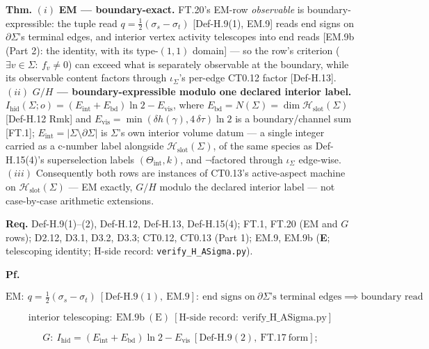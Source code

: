 \begin{theorem}\label{tag:FT-21}
\textbf{Thm.} $(i)$ \textbf{EM — boundary-exact.} FT.20's EM-row \textit{observable} is boundary-expressible: the tuple read $q=\tfrac12(\sigma_s-\sigma_t)$ [Def-H.9(1), EM.9] reads end signs on $\partial\Sigma$'s terminal edges, and interior vertex activity telescopes into end reads [EM.9b (Part 2): the identity, with its type-$(1,1)$ domain] — so the row's criterion ($\exists v\in\Sigma:\ f_v\ne0$) can exceed what is separately observable at the boundary, while its observable content factors through $\iota_\Sigma$'s per-edge CT0.12 factor [Def-H.13]. $(ii)$ \textbf{$G/H$ — boundary-expressible modulo one declared interior label.} $I_{\mathrm{hid}}(\Sigma;o)=(E_{\mathrm{int}}+E_{\mathrm{bd}})\ln2-E_{\mathrm{vis}}$, where $E_{\mathrm{bd}}=N(\Sigma)=\dim\mathcal H_{\mathrm{slot}}(\Sigma)$ [Def-H.12 Rmk] and $E_{\mathrm{vis}}=\min(\delta h(\gamma),4\,\delta\tau)\ln2$ is a boundary/channel sum [FT.1]; $E_{\mathrm{int}}=|\Sigma\setminus\partial\Sigma|$ is $\Sigma$'s own interior volume datum — a single integer carried as a c-number label alongside $\mathcal H_{\mathrm{slot}}(\Sigma)$, of the same species as Def-H.15(4)'s superselection labels $(\Theta_{\mathrm{int}},k)$, and $\neg$factored through $\iota_\Sigma$ edge-wise. $(iii)$ Consequently both rows are instances of CT0.13's active-aspect machine on $\mathcal H_{\mathrm{slot}}(\Sigma)$ — EM exactly, $G/H$ modulo the declared interior label — not case-by-case arithmetic extensions.

\textbf{Req.} Def-H.9(1)–(2), Def-H.12, Def-H.13, Def-H.15(4); FT.1, FT.20 (EM and $G$ rows); D2.12, D3.1, D3.2, D3.3; CT0.12, CT0.13 (Part 1); EM.9, EM.9b (\textbf{E}; telescoping identity; H-side record: \texttt{verify\_\allowbreak{}H\_\allowbreak{}ASigma.py}).

\textbf{Pf.}

\[
\mathrm{EM}:\ q=\tfrac12(\sigma_s-\sigma_t)\ [\mathrm{Def\text{-}H.9}(1),\ \mathrm{EM.9}]:\ \text{end signs on}\ \partial\Sigma\text{'s terminal edges}\implies\text{boundary read}
\]

\[
\text{interior telescoping}:\ \mathrm{EM.9b}\ (\text{E})\ [\text{H-side record}:\ \mathrm{verify\_H\_ASigma.py}]
\]

\[
G:\ I_{\mathrm{hid}}=(E_{\mathrm{int}}+E_{\mathrm{bd}})\ln2-E_{\mathrm{vis}}\ [\mathrm{Def\text{-}H.9}(2),\ \mathrm{FT.17}\ \text{form}];
\]


\end{theorem}

